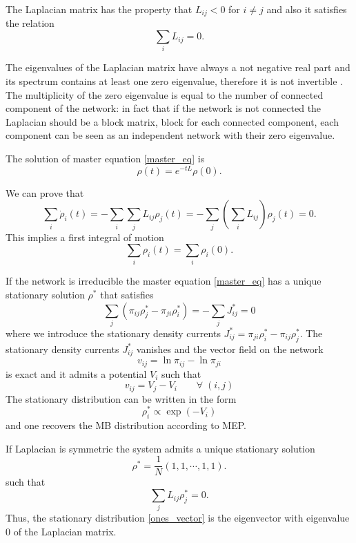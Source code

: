 The Laplacian matrix has the property that $L_{ij} < 0 $ for $i \neq j$ and also it satisfies the relation
\begin{equation}
    \sum_i L_{ij} = 0 .
\end{equation} 

The eigenvalues of the Laplacian matrix have always a not negative real part and its spectrum contains at least one zero eigenvalue, therefore it is not invertible \cite{Boccaletti}. The multiplicity of the zero eigenvalue is equal to the number of connected component of the network: in fact that if the network is not connected the Laplacian should be a block matrix,  block for each connected component, each component can be seen as an independent network with their zero eigenvalue.

The solution of master equation \eqref{master_eq} is
\begin{equation}\label{random_walk_solution}
    \rho(t) = e^{-tL}\rho(0).
\end{equation}

We can prove that
\begin{equation}
    \sum_i \dot\rho_i(t) = - \sum_i \sum_j L_{ij} \rho_j(t) = - \sum_j \left(\sum_i L_{ij}\right) \rho_j(t) = 0 .
\end{equation}
This implies a first integral of motion 
\begin{equation}
    \sum_i \rho_i(t) = \sum_i \rho_i(0) .
\end{equation}

If the network is irreducible the master equation \eqref{master_eq} has a unique stationary solution $\rho^*$ that satisfies
\begin{equation}
    \sum_j (\pi_{ij}\rho_j^\ast-\pi_{ji}\rho_i^\ast)=-\sum_j J^*_{ij}=0
\end{equation}
where we introduce the stationary density currents $J^*_{ij} = \pi_{ji}\rho_i^\ast-\pi_{ij}\rho_j^\ast $.
The stationary density currents $J_{ij}^\ast$ vanishes and the vector field on the network
$$
v_{ij}=\ln \pi_{ij}-\ln \pi_{ji}
$$
is exact and it admits a potential $V_i$ such that
$$
v_{ij}=V_j-V_i\qquad \forall \; (i,j)
$$
The stationary distribution can be written in the form
\begin{equation}
    \label{MB}
    \rho_i^\ast \propto \exp(-V_i)
\end{equation}
and one recovers the MB distribution according to MEP.

If Laplacian is symmetric the system admits a unique stationary solution \cite{Classic_random_walk} 
\begin{equation}\label{ones_vector}
    \rho^* = \frac{1}{N} \left(1,1,\cdots,1,1\right).
\end{equation} 
such that
\begin{equation}
    \sum_j L_{ij}\rho^*_j =  0.
\end{equation}
Thus, the stationary distribution \eqref{ones_vector} is the eigenvector with eigenvalue $0$ of the Laplacian matrix. 

